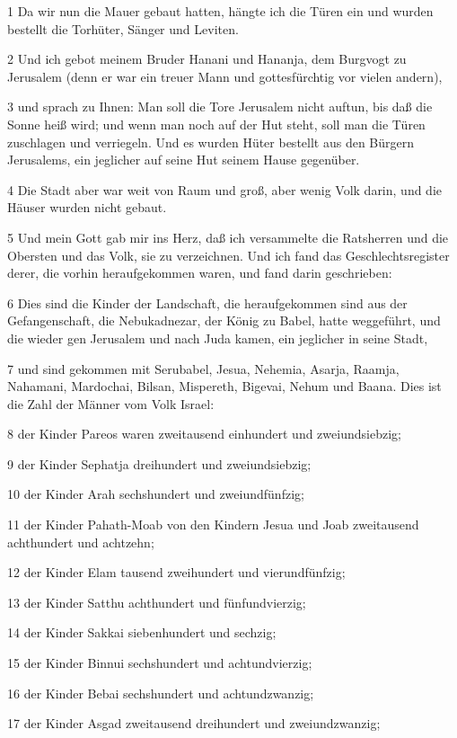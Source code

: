 \par 1 Da wir nun die Mauer gebaut hatten, hängte ich die Türen ein und wurden bestellt die Torhüter, Sänger und Leviten.
\par 2 Und ich gebot meinem Bruder Hanani und Hananja, dem Burgvogt zu Jerusalem (denn er war ein treuer Mann und gottesfürchtig vor vielen andern),
\par 3 und sprach zu Ihnen: Man soll die Tore Jerusalem nicht auftun, bis daß die Sonne heiß wird; und wenn man noch auf der Hut steht, soll man die Türen zuschlagen und verriegeln. Und es wurden Hüter bestellt aus den Bürgern Jerusalems, ein jeglicher auf seine Hut seinem Hause gegenüber.
\par 4 Die Stadt aber war weit von Raum und groß, aber wenig Volk darin, und die Häuser wurden nicht gebaut.
\par 5 Und mein Gott gab mir ins Herz, daß ich versammelte die Ratsherren und die Obersten und das Volk, sie zu verzeichnen. Und ich fand das Geschlechtsregister derer, die vorhin heraufgekommen waren, und fand darin geschrieben:
\par 6 Dies sind die Kinder der Landschaft, die heraufgekommen sind aus der Gefangenschaft, die Nebukadnezar, der König zu Babel, hatte weggeführt, und die wieder gen Jerusalem und nach Juda kamen, ein jeglicher in seine Stadt,
\par 7 und sind gekommen mit Serubabel, Jesua, Nehemia, Asarja, Raamja, Nahamani, Mardochai, Bilsan, Mispereth, Bigevai, Nehum und Baana. Dies ist die Zahl der Männer vom Volk Israel:
\par 8 der Kinder Pareos waren zweitausend einhundert und zweiundsiebzig;
\par 9 der Kinder Sephatja dreihundert und zweiundsiebzig;
\par 10 der Kinder Arah sechshundert und zweiundfünfzig;
\par 11 der Kinder Pahath-Moab von den Kindern Jesua und Joab zweitausend achthundert und achtzehn;
\par 12 der Kinder Elam tausend zweihundert und vierundfünfzig;
\par 13 der Kinder Satthu achthundert und fünfundvierzig;
\par 14 der Kinder Sakkai siebenhundert und sechzig;
\par 15 der Kinder Binnui sechshundert und achtundvierzig;
\par 16 der Kinder Bebai sechshundert und achtundzwanzig;
\par 17 der Kinder Asgad zweitausend dreihundert und zweiundzwanzig;
